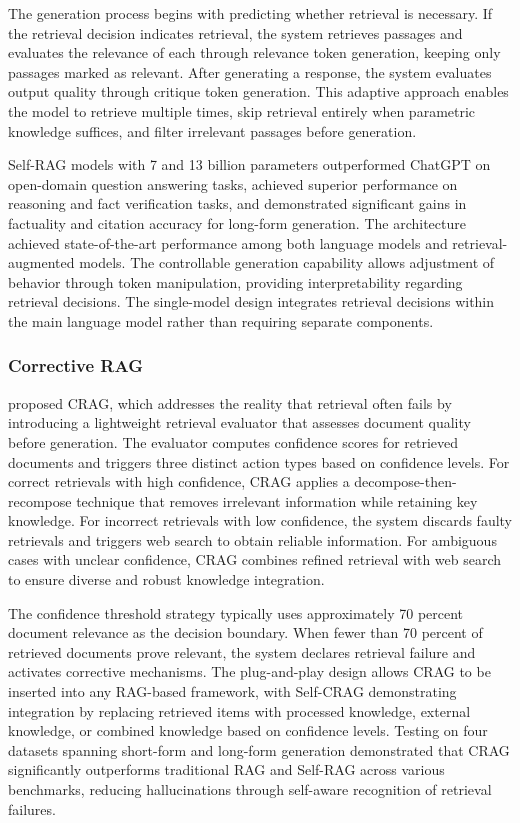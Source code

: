 \documentclass[11pt,letterpaper]{article}
\begin{document}
The generation process begins with predicting whether retrieval is necessary. If the retrieval decision indicates retrieval, the system retrieves passages and evaluates the relevance of each through relevance token generation, keeping only passages marked as relevant. After generating a response, the system evaluates output quality through critique token generation. This adaptive approach enables the model to retrieve multiple times, skip retrieval entirely when parametric knowledge suffices, and filter irrelevant passages before generation.

Self-RAG models with 7 and 13 billion parameters outperformed ChatGPT on open-domain question answering tasks, achieved superior performance on reasoning and fact verification tasks, and demonstrated significant gains in factuality and citation accuracy for long-form generation. The architecture achieved state-of-the-art performance among both language models and retrieval-augmented models. The controllable generation capability allows adjustment of behavior through token manipulation, providing interpretability regarding retrieval decisions. The single-model design integrates retrieval decisions within the main language model rather than requiring separate components.

\subsubsection{Corrective RAG}

\cite{yan2024corrective} proposed CRAG, which addresses the reality that retrieval often fails by introducing a lightweight retrieval evaluator that assesses document quality before generation. The evaluator computes confidence scores for retrieved documents and triggers three distinct action types based on confidence levels. For correct retrievals with high confidence, CRAG applies a decompose-then-recompose technique that removes irrelevant information while retaining key knowledge. For incorrect retrievals with low confidence, the system discards faulty retrievals and triggers web search to obtain reliable information. For ambiguous cases with unclear confidence, CRAG combines refined retrieval with web search to ensure diverse and robust knowledge integration.

The confidence threshold strategy typically uses approximately 70 percent document relevance as the decision boundary. When fewer than 70 percent of retrieved documents prove relevant, the system declares retrieval failure and activates corrective mechanisms. The plug-and-play design allows CRAG to be inserted into any RAG-based framework, with Self-CRAG demonstrating integration by replacing retrieved items with processed knowledge, external knowledge, or combined knowledge based on confidence levels. Testing on four datasets spanning short-form and long-form generation demonstrated that CRAG significantly outperforms traditional RAG and Self-RAG across various benchmarks, reducing hallucinations through self-aware recognition of retrieval failures.
\end{document}
